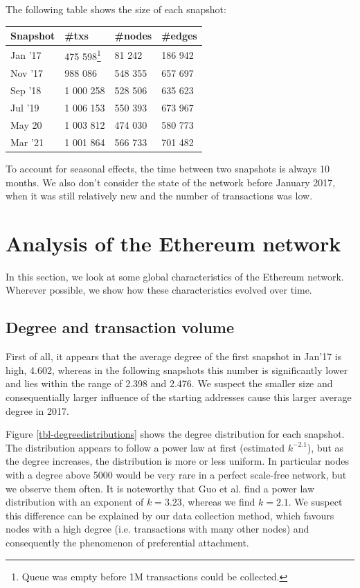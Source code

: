 \documentclass[10pt,a4paper]{article}
\begin{document}
\begin{multicols}{2}
The following table shows the size of each snapshot:\\
\begin{minipage}{\textwidth}
\vspace{5pt}
\bgroup
\def\arraystretch{1.5}
\begin{tabular}{p{}|p{}|p{}|p{}}
\textbf{Snapshot} & \textbf{\#txs} & \textbf{\#nodes} & \textbf{\#edges} \\ 
\hline 
Jan '17 & 475 598\footnote{Queue was empty before 1M transactions could be collected.}& 81 242 & 186 942  \\
Nov '17 & 988 086 & 548 355 & 657 697  \\
Sep '18 & 1 000 258 & 528 506 & 635 623 \\
Jul '19 & 1 006 153 & 550 393 & 673 967 \\
May 20 & 1 003 812 & 474 030 & 580 773 \\
Mar '21 & 1 001 864 & 566 733 & 701 482 \\
\end{tabular}
\egroup
\end{minipage}

\vspace{5pt}
To account for seasonal effects, the time between two snapshots is always 10 months. We also don't consider the state of the network before January 2017, when it was still relatively new and the number of transactions was low.

\section{Analysis of the Ethereum network}
In this section, we look at some global characteristics of the Ethereum network. Wherever possible, we show how these characteristics evolved over time.
\subsection{Degree and transaction volume}
First of all, it appears that the average degree of the first snapshot in Jan'17 is high, 4.602, whereas in the following snapshots this number is significantly lower and lies within the range of 2.398 and 2.476. We suspect the smaller size and consequentially larger influence of the starting addresses cause this larger average degree in 2017.

Figure \ref{tbl-degreedistributions} shows the degree distribution for each snapshot. The distribution appears to follow a power law at first (estimated $k^{-2.1}$), but as the degree increases, the distribution is more or less uniform. In particular nodes with a degree above 5000 would be very rare in a perfect scale-free network, but we observe them often. It is noteworthy that Guo et al. \cite{GUO201958} find a power law distribution with an exponent of $k = 3.23$, whereas we find $k=2.1$. We suspect this difference can be explained by our data collection method, which favours nodes with a high degree (i.e. transactions with many other nodes) and consequently the phenomenon of preferential attachment. 


\end{multicols}
\end{document}
